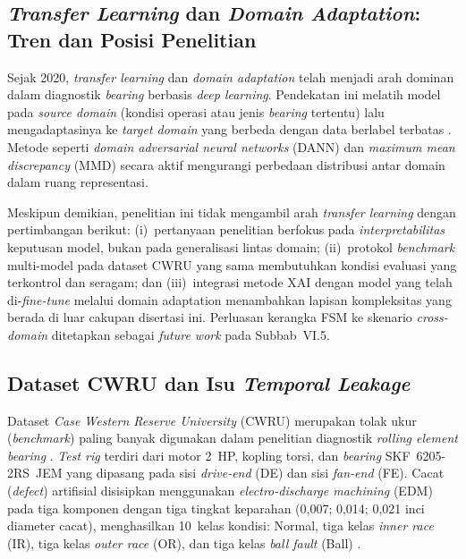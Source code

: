 {\color{blue}\subsection{\emph{Transfer Learning} dan \emph{Domain Adaptation}: Tren dan Posisi Penelitian}
\label{subsec:bab2_transfer_learning}}

{\color{blue}Sejak 2020, \emph{transfer learning} dan \emph{domain adaptation} telah menjadi
arah dominan dalam diagnostik \emph{bearing} berbasis \emph{deep learning}.
Pendekatan ini melatih model pada \emph{source domain} (kondisi operasi atau
jenis \emph{bearing} tertentu) lalu mengadaptasinya ke \emph{target domain}
yang berbeda dengan data berlabel terbatas .
Metode seperti \emph{domain adversarial neural networks} (DANN)
 dan \emph{maximum mean discrepancy} (MMD) secara
aktif mengurangi perbedaan distribusi antar domain dalam ruang representasi.}

{\color{blue}Meskipun demikian, penelitian ini tidak mengambil arah \emph{transfer learning}
dengan pertimbangan berikut: (i)~pertanyaan penelitian berfokus pada
\emph{interpretabilitas} keputusan model, bukan pada generalisasi lintas domain;
(ii)~protokol \emph{benchmark} multi-model pada dataset CWRU yang sama membutuhkan
kondisi evaluasi yang terkontrol dan seragam; dan (iii)~integrasi metode XAI
dengan model yang telah di-\emph{fine-tune} melalui domain adaptation
menambahkan lapisan kompleksitas yang berada di luar cakupan disertasi ini.
Perluasan kerangka FSM ke skenario \emph{cross-domain} ditetapkan sebagai
\emph{future work} pada Subbab~VI.5.}

\subsection{Dataset CWRU dan Isu \emph{Temporal Leakage}}
\label{subsec:bab2_cwru}

Dataset \emph{Case Western Reserve University} (CWRU) merupakan tolak ukur (\emph{benchmark})
paling banyak digunakan dalam penelitian diagnostik \emph{rolling element bearing}
. \emph{Test rig} terdiri dari motor 2~HP, kopling
torsi, dan \emph{bearing} SKF~6205-2RS~JEM yang dipasang pada sisi \emph{drive-end}
(DE) dan sisi \emph{fan-end} (FE). Cacat (\emph{defect}) artifisial disisipkan menggunakan
\emph{electro-discharge machining} (EDM) pada tiga komponen dengan tiga tingkat
keparahan (0,007; 0,014; 0,021 inci diameter cacat), menghasilkan 10~kelas
kondisi: Normal, tiga kelas \emph{inner race} (IR), tiga kelas \emph{outer
race} (OR), dan tiga kelas \emph{ball fault} (Ball) .

